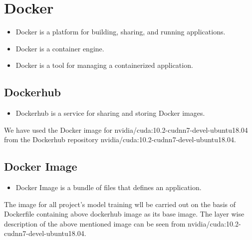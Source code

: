     \section{Docker}
        \begin{itemize}%
            \item Docker is a platform for building, sharing, and running applications.
            \item Docker is a container engine.
            \item Docker is a tool for managing a containerized application.
        \end{itemize}

        \subsection{Dockerhub}
            \begin{itemize}%
                \item Dockerhub is a service for sharing and storing Docker images.
            \end{itemize}
            We have used the Docker image for nvidia/cuda:10.2-cudnn7-devel-ubuntu18.04 from the Dockerhub repository nvidia/cuda:10.2-cudnn7-devel-ubuntu18.04\cite{docker_hub_2021}.

        \subsection{Docker Image}
            \begin{itemize}%
                \item Docker Image is a bundle of files that defines an application.
            \end{itemize}
                The image for all project's model training wll be carried out on the basis of Dockerfile containing above dockerhub image as its base image.
                The layer wise description of the above mentioned image can be seen from nvidia/cuda:10.2-cudnn7-devel-ubuntu18.04\cite{docker_hub_2021}.

